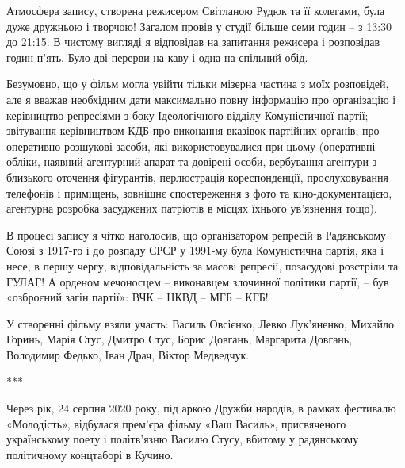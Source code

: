 Атмосфера запису, створена режисером Світланою Рудюк та її колегами, була дуже
дружньою і творчою! Загалом провів у студії більше семи годин – з 13:30 до
21:15. В чистому вигляді я відповідав на запитання режисера і розповідав годин
п’ять. Було дві перерви на каву і одна на спільний обід.


Безумовно, що у фільм могла увійти тільки мізерна частина з моїх розповідей,
але я вважав необхідним дати максимально повну інформацію про організацію і
керівництво репресіями з боку Ідеологічного відділу Комуністичної партії;
звітування керівництвом КДБ про виконання вказівок партійних органів; про
оперативно-розшукові засоби, які використовувалися при цьому (оперативні
обліки, наявний агентурний апарат та довірені особи, вербування агентури з
близького оточення фігурантів, перлюстрація кореспонденції, прослуховування
телефонів і приміщень, зовнішнє спостереження з фото та  кіно-документацією,
агентурна розробка засуджених патріотів в місцях їхнього ув’язнення тощо). 


В процесі запису я чітко наголосив, що організатором репресій в Радянському
Союзі з 1917-го і до розпаду СРСР у 1991-му була Комуністична партія, яка і
несе, в першу чергу, відповідальність за масові репресії, позасудові розстріли
та ГУЛАГ! А  орденом мечоносцем –  виконавцем злочинної політики партії, – був
«озброєний загін партії»: ВЧК – НКВД – МГБ – КГБ!


У створенні фільму взяли участь: Василь Овсієнко, Левко Лук’яненко, Михайло
Горинь, Марія Стус, Дмитро Стус, Борис Довгань, Маргарита Довгань, Володимир
Федько, Іван Драч, Віктор Медведчук.


***

Через рік, 24 серпня 2020 року, під аркою Дружби народів, в рамках фестивалю
«Молодість», відбулася прем'єра фільму «Ваш Василь», присвяченого українському
поету і політв'язню Василю Стусу, вбитому у радянському політичному концтаборі
в Кучино. 

